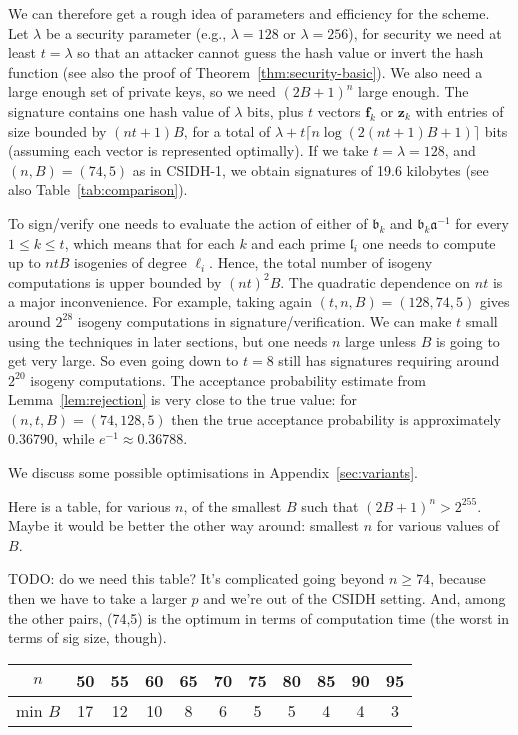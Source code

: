 \documentclass{llncs}
\renewcommand{\a}{\mathfrak{a}}
\renewcommand{\b}{\mathfrak{b}}
\renewcommand{\l}{\mathfrak{l}}
\newcommand{\f}{\textbf{f}}
\newcommand{\z}{\textbf{z}}
\begin{document}
We can therefore get a rough idea of parameters and efficiency for the scheme.
Let $\lambda$ be a security parameter (e.g., $\lambda=128$ or $\lambda=256$), for security
we need at least $t=\lambda$ so that an attacker cannot guess the hash value or invert the hash function (see also the proof of Theorem~\ref{thm:security-basic}).
We also need a large enough set of private keys, so we need $(2B+1)^n$ large enough.
The signature contains one hash value of $\lambda$ bits, plus $t$ vectors $\f_k$ or $\z_k$ with entries of size bounded by $(nt+1)B$, for a total of $\lambda + t\lceil n\log(2(nt+1)B + 1)\rceil$ bits (assuming each vector is represented optimally). If we take $t=\lambda=128$, and $(n,B)=(74,5)$ as in CSIDH-1, we obtain signatures of 19.6 kilobytes (see also Table~\ref{tab:comparison}).

To sign/verify one needs to evaluate the action of either of $\b_k$ and $\b_k\a^{-1}$ for every $1\le k\le t$,
which means that for each $k$ and each prime $\l_i$ one needs to compute up to $ntB$ isogenies of degree $\ell_i$.
Hence, the total number of isogeny computations is upper bounded by $(nt)^2 B$.
The quadratic dependence on $nt$ is a major inconvenience.
For example, taking again $(t,n,B)=(128,74,5)$ gives around $2^{28}$ isogeny computations in signature/verification.
We can make $t$ small using the techniques in later sections, but one needs $n$ large unless $B$ is going to get very large. So even going down to $t=8$ still has signatures requiring around $2^{20}$ isogeny computations.
The acceptance probability estimate from Lemma~\ref{lem:rejection} is very close to the true value: for $(n,t,B)=(74,128,5)$ then the true acceptance probability is approximately $0.36790$, while $e^{-1} \approx 0.36788$.

We discuss some possible optimisations in Appendix~\ref{sec:variants}.


Here is a table, for various $n$, of the smallest $B$ such that $(2B+1)^n > 2^{255}$.
Maybe it would be better the other way around: smallest $n$ for various values of $B$.

TODO: do we need this table? It's complicated going beyond $n\ge 74$, because then we have to take a larger $p$ and we're out of the CSIDH setting. And, among the other pairs, (74,5) is the optimum in terms of computation time (the worst in terms of sig size, though).

\begin{center}
\begin{tabular}{c||c|c|c|c|c|c|c|c|c|c}
 $n$     & 50 & 55 & 60 & 65 & 70 & 75 & 80 & 85 & 90 & 95 \\
\hline
 min $B$ & 17 & 12 & 10 &  8 &  6 &  5 &  5 &  4 &  4 &  3 \\
\end{tabular}
\end{center}
\end{document}
